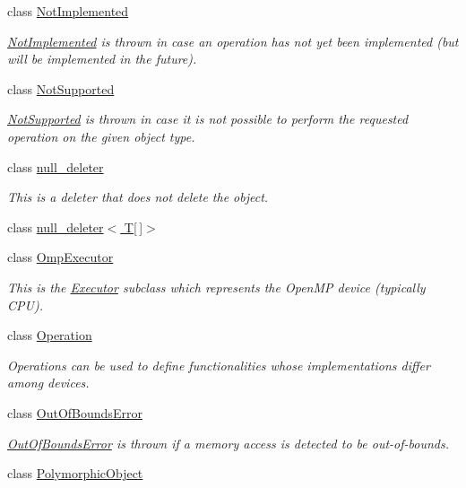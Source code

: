 \begin{DoxyCompactItemize}
class \hyperlink{classgko_1_1NotImplemented}{Not\+Implemented}
\begin{DoxyCompactList}\small\item\em \hyperlink{classgko_1_1NotImplemented}{Not\+Implemented} is thrown in case an operation has not yet been implemented (but will be implemented in the future). \end{DoxyCompactList}\item 
class \hyperlink{classgko_1_1NotSupported}{Not\+Supported}
\begin{DoxyCompactList}\small\item\em \hyperlink{classgko_1_1NotSupported}{Not\+Supported} is thrown in case it is not possible to perform the requested operation on the given object type. \end{DoxyCompactList}\item 
class \hyperlink{classgko_1_1null__deleter}{null\+\_\+deleter}
\begin{DoxyCompactList}\small\item\em This is a deleter that does not delete the object. \end{DoxyCompactList}\item 
class \hyperlink{classgko_1_1null__deleter_3_01T[]_4}{null\+\_\+deleter$<$ T\mbox{[}$\,$\mbox{]}$>$}
\item 
class \hyperlink{classgko_1_1OmpExecutor}{Omp\+Executor}
\begin{DoxyCompactList}\small\item\em This is the \hyperlink{classgko_1_1Executor}{Executor} subclass which represents the Open\+MP device (typically C\+PU). \end{DoxyCompactList}\item 
class \hyperlink{classgko_1_1Operation}{Operation}
\begin{DoxyCompactList}\small\item\em Operations can be used to define functionalities whose implementations differ among devices. \end{DoxyCompactList}\item 
class \hyperlink{classgko_1_1OutOfBoundsError}{Out\+Of\+Bounds\+Error}
\begin{DoxyCompactList}\small\item\em \hyperlink{classgko_1_1OutOfBoundsError}{Out\+Of\+Bounds\+Error} is thrown if a memory access is detected to be out-\/of-\/bounds. \end{DoxyCompactList}\item 
class \hyperlink{classgko_1_1PolymorphicObject}{Polymorphic\+Object}

\end{DoxyCompactItemize}
